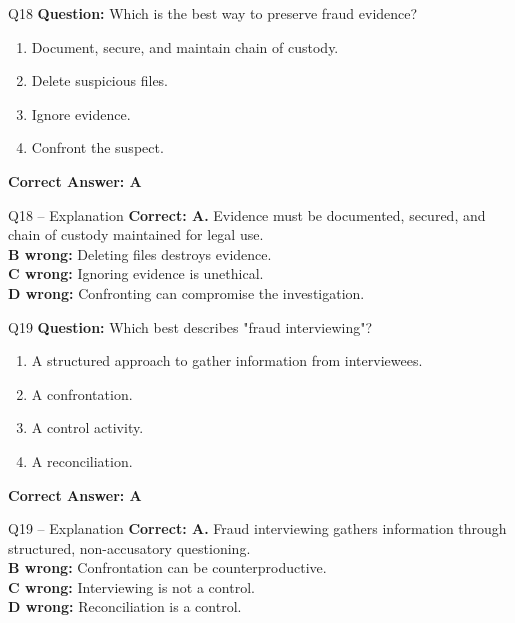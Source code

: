 \documentclass[aspectratio=169,10pt]{beamer}
\begin{document}
	\begin{frame}[t]{Q18}
		\small
		\textbf{Question:} Which is the best way to preserve fraud evidence?
		\begin{enumerate}[label=\Alph*.,itemsep=1pt,topsep=2pt]
			\item Document, secure, and maintain chain of custody.
			\item Delete suspicious files.
			\item Ignore evidence.
			\item Confront the suspect.
		\end{enumerate}
		\vspace{4pt}
		\textbf{Correct Answer: A}
	\end{frame}
	
	\begin{frame}[t]{Q18 -- Explanation}
		\small
		\textbf{Correct: A.} Evidence must be documented, secured, and chain of custody maintained for legal use. \\[4pt]
		\textbf{B wrong:} Deleting files destroys evidence. \\[2pt]
		\textbf{C wrong:} Ignoring evidence is unethical. \\[2pt]
		\textbf{D wrong:} Confronting can compromise the investigation.
	\end{frame}
	
	\begin{frame}[t]{Q19}
		\small
		\textbf{Question:} Which best describes "fraud interviewing"?
		\begin{enumerate}[label=\Alph*.,itemsep=1pt,topsep=2pt]
			\item A structured approach to gather information from interviewees.
			\item A confrontation.
			\item A control activity.
			\item A reconciliation.
		\end{enumerate}
		\vspace{4pt}
		\textbf{Correct Answer: A}
	\end{frame}
	
	\begin{frame}[t]{Q19 -- Explanation}
		\small
		\textbf{Correct: A.} Fraud interviewing gathers information through structured, non-accusatory questioning. \\[4pt]
		\textbf{B wrong:} Confrontation can be counterproductive. \\[2pt]
		\textbf{C wrong:} Interviewing is not a control. \\[2pt]
		\textbf{D wrong:} Reconciliation is a control.
	\end{frame}
	
\end{document}
